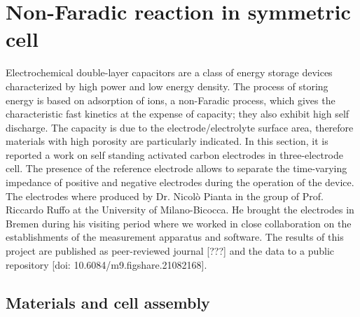 \chapter{Non-Faradic reaction in symmetric cell}
\label{chap:capacitor}


Electrochemical double-layer capacitors are a class of energy storage devices characterized by high power and low energy density. The process of storing energy is based on adsorption of ions, a non-Faradic process, which gives the characteristic fast kinetics at the expense of capacity; they also exhibit high self discharge. The capacity is due to the electrode/electrolyte surface area, therefore materials with high porosity are particularly indicated. In this section, it is reported a work on self standing activated carbon electrodes in three-electrode cell. The presence of the reference electrode allows to separate the time-varying impedance of positive and negative electrodes during the operation of the device.
The electrodes where produced by Dr. Nicolò Pianta in the group of Prof. Riccardo Ruffo at the University of Milano-Bicocca. He brought the electrodes in Bremen during his visiting period where we worked in close collaboration on the establishments of the measurement apparatus and software. The results of this project are published as peer-reviewed journal [???] and the data to a public repository [doi: 10.6084/m9.figshare.21082168].

\section{Materials and cell assembly}
